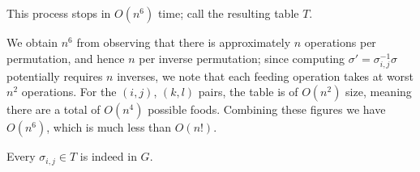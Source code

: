 \begin{claim}
    This process stops in $O(n^6)$ time; call the resulting table $T$.
\end{claim}
\noindent We obtain $n^6$ from observing that there is approximately $n$ operations per permutation, and hence $n$ per inverse permutation; since computing $\sigma' = \sigma_{i,j}^{-1} \sigma$ potentially requires $n$ inverses, we note that each feeding operation takes at worst $n^2$ operations. For the $(i, j)$, $(k, l)$ pairs, the table is of $O(n^2)$ size, meaning there are a total of $O(n^4)$ possible foods. Combining these figures we have $O(n^6)$, which is much less than $O(n!)$.
\begin{claim}
    Every $\sigma_{i, j} \in T$ is indeed in $G$.
\end{claim}